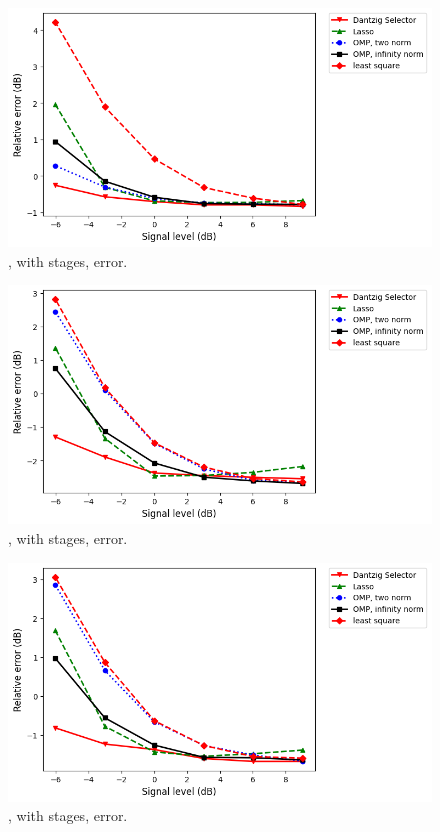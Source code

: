\begin {figure} [H]
\includegraphics [width = \textwidth] {error-medium-wide-two.png}
\caption {, with  stages, error.}
\end {figure}

\begin {figure} [H]
\includegraphics [width = \textwidth] {error-medium-square-four.png}
\caption {, with  stages, error.}
\end {figure}

\begin {figure} [H]
\includegraphics [width = \textwidth] {error-medium-tall-four.png}
\caption {, with  stages, error.}
\end {figure}

